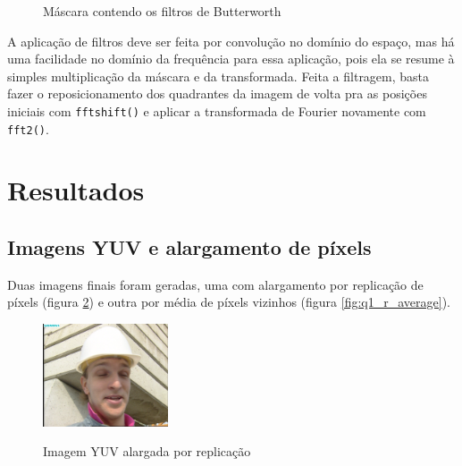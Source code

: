 \documentclass[conference]{IEEEtran}
\begin{document}
\begin{figure}
    \centering
    \caption\scriptsize{Máscara contendo os filtros de Butterworth}
    \label{fig:q3_m_butterworth}
\end{figure}

A aplicação de filtros deve ser feita por convolução no domínio do espaço, mas há uma facilidade no domínio da frequência para essa aplicação, pois ela se resume à simples multiplicação da máscara e da transformada. Feita a filtragem, basta fazer o reposicionamento dos quadrantes da imagem de volta pra as posições iniciais com \texttt{fftshift()} e aplicar a transformada de Fourier novamente com \texttt{fft2()}.


\section{Resultados}


\subsection{Imagens YUV e alargamento de píxels}

Duas imagens finais foram geradas, uma com alargamento por replicação de píxels (figura \ref{fig:q1_r_replication}) e outra por média de píxels vizinhos (figura \ref{fig:q1_r_average}).

\begin{figure}
    \centering
    \includegraphics[width=0.33\textwidth]{imgs/Q1-3 YUV to RGB large.png}
    \caption\scriptsize{Imagem YUV alargada por replicação}
    \label{fig:q1_r_replication}
\end{figure}
\end{document}
